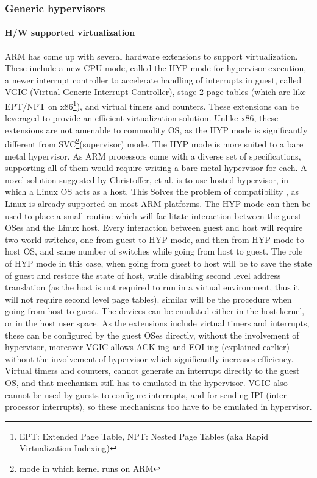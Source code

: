 \documentclass[a4paper,10pt]{article}
\begin{document}
  \subsubsection{Generic hypervisors}
  
  \paragraph{H/W supported virtualization}

  ARM has come up with several hardware extensions to support virtualization. These include a new CPU mode, called the HYP mode for hypervisor execution,
  a newer interrupt controller to accelerate handling of interrupts in guest, called VGIC (Virtual Generic Interrupt Controller), stage 2 page tables (which are like EPT/NPT on x86\footnote{EPT: Extended Page Table, NPT: Nested Page Tables (aka Rapid Virtualization Indexing)}),
  and virtual timers and counters. 
  These extensions can be leveraged to provide an efficient virtualization solution. Unlike x86, these extensions are not amenable to commodity OS, as the HYP mode is significantly
  different from SVC\footnote{mode in which kernel runs on ARM}(supervisor)  mode.
  The HYP mode is more suited to a bare metal hypervisor. As ARM processors come with a diverse set of specifications, supporting all of them would require
  writing a bare metal hypervisor for each. A novel solution suggested by Christoffer, et al. \cite{Dall:2014:KDI:2541940.2541946} is to use hosted hypervisor, in which
  a Linux OS acts as a host. This Solves the problem of compatibility , as Linux is already supported on most ARM platforms.
  The HYP mode can then be used to place a small routine which will facilitate interaction between the guest OSes and the Linux host.
  Every interaction between guest and host will require two world switches, one from guest to HYP mode, and then from HYP mode to host OS, and same number of switches while going 
  from host to guest. The role of HYP mode in this case, when going from guest to host will be to save the state of guest and restore the state of host, while disabling second level address translation
  (as the host is not required to run in a virtual environment, thus it will not require second level page tables). similar will be the procedure when going from host to guest.
  The devices can be emulated either in the host kernel, or in the host user space. As the extensions include virtual timers and interrupts, these can be configured by the
  guest OSes directly, without the involvement of hypervisor, moreover VGIC allows ACK-ing and EOI-ing (explained earlier) without the involvement of hypervisor which
  significantly increases efficiency. Virtual timers and counters, cannot generate an interrupt directly to the guest OS, and that mechanism still has to emulated in the
  hypervisor. VGIC also cannot be used by guests to configure interrupts, and for sending IPI (inter processor interrupts), so these mechanisms too have to be
  emulated in hypervisor.
  
\end{document}
